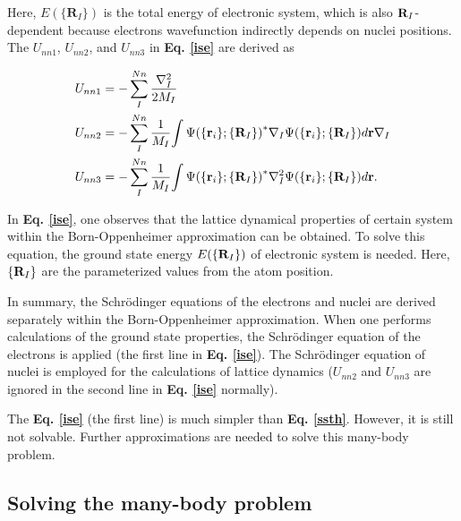 \documentclass[a4paper, 12pt, titlepage,oneside,drop]{kthesis}
\begin{document}
\noindent Here, $E{(\{\textbf{R}_{I}\})}$ is the total energy of electronic system, which is also ${\textbf R}_I$-dependent because electrons wavefunction indirectly depends on nuclei positions. The ${U}_{nn1}$,
${U}_{nn2}$, and ${U}_{nn3}$ in \textbf{Eq. \ref{ise}} are derived as

\begin{equation}\begin{split}
 &  {U}_{nn1} = - \sum\limits_I^{{Nn}} \frac{{{\nabla}_{{I}}^{2}}}{2 M_{I}}   \\
 &  {U}_{nn2} = - \sum\limits_I^{{Nn}} \frac{1}{M_{I}} {\int {\Psi(\{\textbf{r}_{{i}}\}; \{\textbf{R}_{I}\})}^{\ast} {{\nabla}_{{I}}} {{\Psi(\{\textbf{r}_{{i}} \}; \{\textbf{R}_{I}\})}} d {\textbf r }} {{\nabla}_{{I}}}  \\
 &  {U}_{nn3} = - \sum\limits_I^{{Nn}} \frac{1}{M_{I}} {\int {{\Psi(\{\textbf{r}_{{i}}\}; \{\textbf{R}_{I}\})}}^{\ast} {{\nabla}_{{I}}^{2}} {{\Psi(\{\textbf{r}_{{i}} \}; \{\textbf{R}_{I}\})}} d {\textbf r }}. 
\end{split}\end{equation}

In \textbf{Eq. \ref{ise}}, one observes that the lattice dynamical properties of certain system within the Born-Oppenheimer approximation can be obtained. To solve this equation,
the ground state energy $E(\{{{\textbf R}_{I}}\})$ of electronic system is needed. Here, $\{{\textbf R}_{I}\}$ are the parameterized values from the atom position.
 
In summary, the Schrödinger equations of the electrons and nuclei are derived separately within the Born-Oppenheimer approximation. When one performs calculations of the ground state properties,
the Schrödinger equation of the electrons is applied (the first line in \textbf{Eq. \ref{ise}}). The Schrödinger equation of nuclei is employed for the calculations of lattice dynamics 
($U_{nn2}$ and $U_{nn3}$ are ignored \cite{clasdft} in the second line in \textbf{Eq. \ref{ise}} normally).

The \textbf{Eq. \ref{ise}} (the first line) is much simpler than \textbf{Eq. \ref{ssth}}. However, it is still not solvable. Further approximations  are needed
to solve this many-body problem.

\subsection{Solving the many-body problem}
\end{document}
